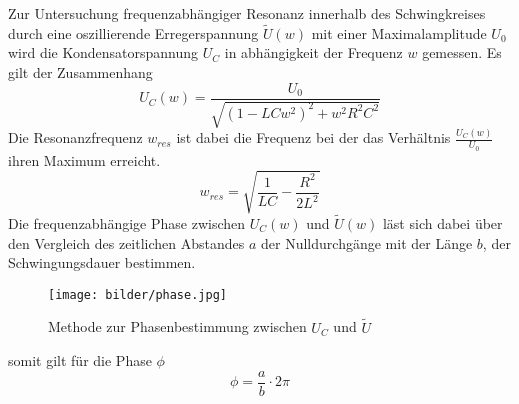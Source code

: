Zur Untersuchung frequenzabhängiger Resonanz innerhalb des Schwingkreises durch
eine oszillierende Erregerspannung $\tilde{U}(w)$ mit einer Maximalamplitude $U_0$
wird die Kondensatorspannung $U_C$ in abhängigkeit der Frequenz $w$ gemessen.
Es gilt der Zusammenhang
\begin{equation}
    U_C(w)=\frac{U_0}{\sqrt{(1-LCw^2)^2+w^2R^2C^2}}
\end{equation}
Die Resonanzfrequenz $w_{res}$ ist dabei die Frequenz bei der das Verhältnis 
$\frac{U_C(w)}{U_0}$ ihren Maximum erreicht.
\begin{equation}
    w_{res}=\sqrt{\frac{1}{LC}-\frac{R^2}{2L^2}}
\end{equation}
\newpage
Die frequenzabhängige Phase zwischen $U_C(w)$ und $\tilde{U}(w)$ läst sich
dabei über den Vergleich des zeitlichen Abstandes $a$ der Nulldurchgänge 
mit der Länge $b$, der Schwingungsdauer bestimmen.
\begin{figure}
    \centering
    \texttt{[image: bilder/phase.jpg]}
    \caption{Methode zur Phasenbestimmung zwischen $U_C$ und $\tilde{U}$}
\end{figure}
somit gilt für die Phase $\phi$
\begin{equation}
    \phi = \frac{a}{b}\cdot 2\pi
\end{equation}


\label{sec:theorie}